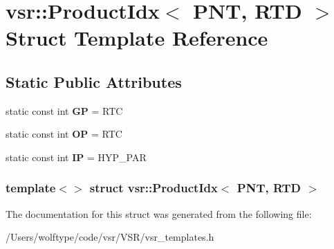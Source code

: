 \hypertarget{structvsr_1_1_product_idx_3_01_p_n_t_00_01_r_t_d_01_4}{\section{vsr\-:\-:Product\-Idx$<$ P\-N\-T, R\-T\-D $>$ Struct Template Reference}
\label{structvsr_1_1_product_idx_3_01_p_n_t_00_01_r_t_d_01_4}
}
\subsection*{Static Public Attributes}
\begin{DoxyCompactItemize}
\item 
\hypertarget{structvsr_1_1_product_idx_3_01_p_n_t_00_01_r_t_d_01_4_a6ad05f689aaba38b0fe5648fb7c3bb42}{static const int {\bfseries G\-P} = R\-T\-C}\label{structvsr_1_1_product_idx_3_01_p_n_t_00_01_r_t_d_01_4_a6ad05f689aaba38b0fe5648fb7c3bb42}

\item 
\hypertarget{structvsr_1_1_product_idx_3_01_p_n_t_00_01_r_t_d_01_4_a3d919d838b14d109c690d1961ae3b02d}{static const int {\bfseries O\-P} = R\-T\-C}\label{structvsr_1_1_product_idx_3_01_p_n_t_00_01_r_t_d_01_4_a3d919d838b14d109c690d1961ae3b02d}

\item 
\hypertarget{structvsr_1_1_product_idx_3_01_p_n_t_00_01_r_t_d_01_4_aced9783fd2fbee5cc4883c90d576d4ab}{static const int {\bfseries I\-P} = H\-Y\-P\-\_\-\-P\-A\-R}\label{structvsr_1_1_product_idx_3_01_p_n_t_00_01_r_t_d_01_4_aced9783fd2fbee5cc4883c90d576d4ab}

\end{DoxyCompactItemize}
\subsubsection*{template$<$$>$ struct vsr\-::\-Product\-Idx$<$ P\-N\-T, R\-T\-D $>$}



The documentation for this struct was generated from the following file\-:\begin{DoxyCompactItemize}
\item 
/\-Users/wolftype/code/vsr/\-V\-S\-R/vsr\-\_\-templates.\-h\end{DoxyCompactItemize}
